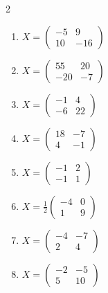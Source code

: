 \begin{multicols}{2}
\begin{enumerate}[label=\arabic*., leftmargin=*, itemsep=1pt]
\item $X=\left(\begin{smallmatrix}-5 & 9\\ 10 & -16\end{smallmatrix}\right)$
\item $X=\left(\begin{smallmatrix}55 & 20\\ -20 & -7\end{smallmatrix}\right)$
\item $X=\left(\begin{smallmatrix}-1 & 4\\ -6 & 22\end{smallmatrix}\right)$
\item $X=\left(\begin{smallmatrix}18 & -7\\ 4 & -1\end{smallmatrix}\right)$
\item $X=\left(\begin{smallmatrix}-1 & 2\\ -1 & 1\end{smallmatrix}\right)$
\item $X=\frac{1}{2}\left(\begin{smallmatrix}-4 & 0\\ 1 & 9\end{smallmatrix}\right)$
\item $X=\left(\begin{smallmatrix}-4 & -7\\ 2 & 4\end{smallmatrix}\right)$
\item $X=\left(\begin{smallmatrix}-2 & -5\\ 5 & 10\end{smallmatrix}\right)$
\end{enumerate}
\end{multicols}
